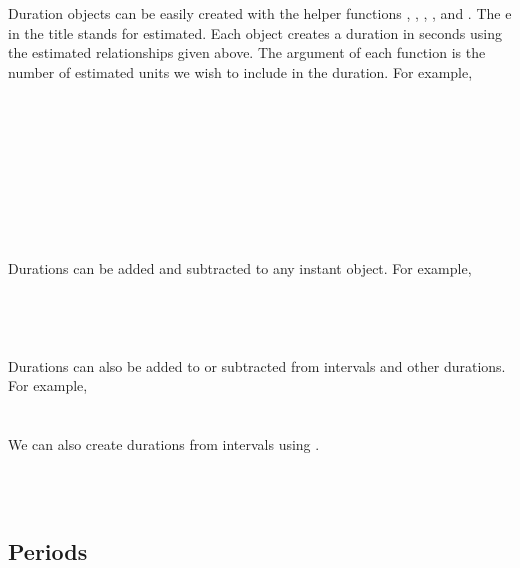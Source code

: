 \documentclass[article]{jss}
\begin{document}
Duration objects can be easily created with the helper functions 
, , , , and  . The e in the title stands for estimated. Each object creates a duration in seconds using the estimated relationships given above. The argument of each function is the number of estimated units we wish to include in the duration. For example,\\

\\
\\

\\
\\

\\
\\

\\
\\
\\

Durations can be added and subtracted to any instant object. For example,\\

\\
\\

\\
\\

Durations can also be added to or subtracted from intervals and other durations. For example,\\

\\
\\

We can also create durations from intervals using . 

\\
\\


\subsection{Periods}
\label{sec:periods}
\end{document}
